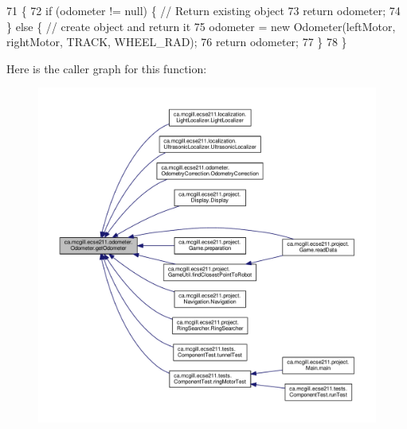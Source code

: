 \begin{DoxyCode}
71                                 \{
72     \textcolor{keywordflow}{if} (odometer != null) \{ \textcolor{comment}{// Return existing object}
73       \textcolor{keywordflow}{return} odometer;
74     \} \textcolor{keywordflow}{else} \{ \textcolor{comment}{// create object and return it}
75       odometer = \textcolor{keyword}{new} Odometer(leftMotor, rightMotor, TRACK, WHEEL\_RAD);
76       \textcolor{keywordflow}{return} odometer;
77     \}
78   \}
\end{DoxyCode}
Here is the caller graph for this function\+:
\nopagebreak
\begin{figure}[H]
\begin{center}
\leavevmode
\includegraphics[width=350pt]{classca_1_1mcgill_1_1ecse211_1_1odometer_1_1_odometer_a99171f11e34dea918fa9dd069d721439_icgraph}
\end{center}
\end{figure}
\mbox{\label{classca_1_1mcgill_1_1ecse211_1_1odometer_1_1_odometer_a4e069b5a96cd43b29af0785244a99b51}} 
